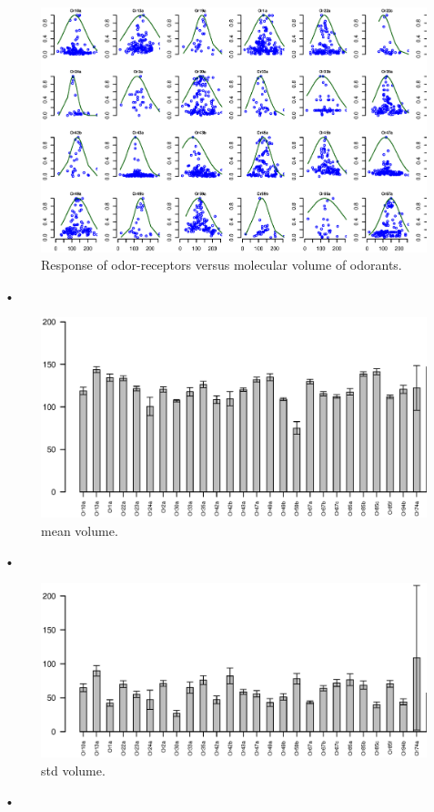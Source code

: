 \documentclass[11pt]{paper} %
\begin{document}
\begin{figure}
\includegraphics[width=\textwidth]{fig/vol-res}
\caption{Response of odor-receptors  versus molecular volume of odorants.}
\end{figure}•

\begin{figure}
\includegraphics[width=\textwidth]{fig/mean-vol}
\caption{mean volume.}
\end{figure}•

\begin{figure}
\includegraphics[width=\textwidth]{fig/std-vol}
\caption{std volume.}
\end{figure}•
\end{document}
